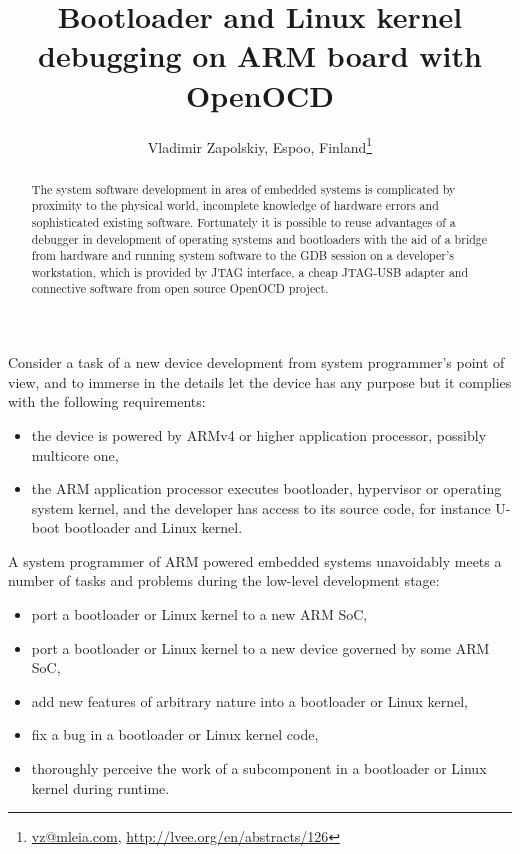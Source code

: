 \documentclass[10pt, a5paper]{article}
\begin{document}
\title{Bootloader and Linux kernel debugging on ARM board with OpenOCD}
\author{Vladimir Zapolskiy, Espoo, Finland\footnote{\url{vz@mleia.com}, \url{http://lvee.org/en/abstracts/126}}}
\maketitle
\begin{abstract}
The system software development in area of embedded systems is complicated by proximity to the physical world, incomplete knowledge of hardware errors and sophisticated existing software. Fortunately it is possible to reuse advantages of a debugger in development of operating systems and bootloaders with the aid of a bridge from hardware and running system software to the GDB session on a developer's workstation, which is provided by JTAG interface, a cheap JTAG-USB adapter and connective software from open source OpenOCD project.
\end{abstract}
Consider a task of a new device development from system programmer's point of view, and to immerse in the details let the device has any purpose but it complies with the following requirements:

\begin{itemize}
  \item the device is powered by ARMv4 or higher application processor, possibly multicore one,
  \item the ARM application processor executes bootloader, hypervisor or operating system kernel, and the developer has access to its source code, for instance U-boot bootloader and Linux kernel.
\end{itemize}

A system programmer of ARM powered embedded systems unavoid\-ably meets a number of tasks and problems during the low-level development stage:

\begin{itemize}
  \item port a bootloader or Linux kernel to a new ARM SoC,
  \item port a bootloader or Linux kernel to a new device governed by some ARM SoC,
  \item add new features of arbitrary nature into a bootloader or Linux kernel,
  \item fix a bug in a bootloader or Linux kernel code,
  \item thoroughly perceive the work of a subcomponent in a bootloader or Linux kernel during runtime.
\end{itemize}
\end{document}
